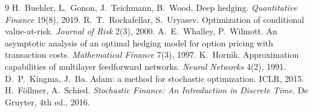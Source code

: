 \documentclass[11pt]{article}
\theoremstyle{definition}
\theoremstyle{remark}
\begin{document}
\begin{thebibliography}{9}
 H.~Buehler, L.~Gonon, J.~Teichmann, B.~Wood. Deep hedging. \emph{Quantitative Finance} 19(8), 2019.
 R.~T.~Rockafellar, S.~Uryasev. Optimization of conditional value-at-risk. \emph{Journal of Risk} 2(3), 2000.
 A.~E.~Whalley, P.~Wilmott. An asymptotic analysis of an optimal hedging model for option pricing with transaction costs. \emph{Mathematical Finance} 7(3), 1997.
 K.~Hornik. Approximation capabilities of multilayer feedforward networks. \emph{Neural Networks} 4(2), 1991.
 D.~P.~Kingma, J.~Ba. Adam: a method for stochastic optimization. ICLR, 2015.
 H.~F\"ollmer, A.~Schied. \emph{Stochastic Finance: An Introduction in Discrete Time}. De Gruyter, 4th ed., 2016.
\end{thebibliography}
\end{document}
